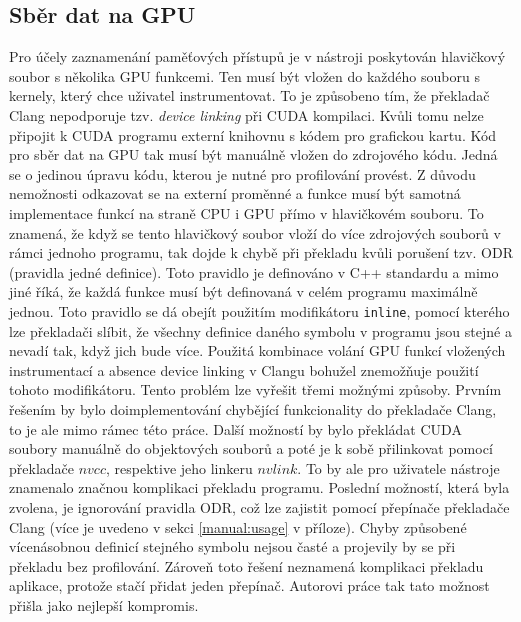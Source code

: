 \subsection{Sběr dat na GPU}
\label{sec:gpucollection}
Pro účely zaznamenání paměťových přístupů je v nástroji poskytován hlavičkový soubor s několika GPU funkcemi. Ten musí být vložen do každého souboru s kernely, který chce uživatel instrumentovat. To je způsobeno tím, že překladač Clang nepodporuje tzv. \emph{device linking} při CUDA kompilaci. Kvůli tomu nelze připojit k CUDA programu externí knihovnu s kódem pro grafickou kartu. Kód pro sběr dat na GPU tak musí být manuálně vložen do zdrojového kódu. Jedná se o jedinou úpravu kódu, kterou je nutné pro profilování provést.
Z důvodu nemožnosti odkazovat se na externí proměnné a funkce musí být samotná implementace funkcí na straně CPU i GPU přímo v hlavičkovém souboru. To znamená, že když se tento hlavičkový soubor vloží do více zdrojových souborů v rámci jednoho programu, tak dojde k chybě při překladu kvůli porušení tzv. ODR (pravidla jedné definice). Toto pravidlo je definováno v C++ standardu \cite{cppiso} a mimo jiné říká, že každá funkce musí být definovaná v celém programu maximálně jednou. Toto pravidlo se dá obejít použitím modifikátoru \texttt{inline}, pomocí kterého lze překladači slíbit, že všechny definice daného symbolu v programu jsou stejné a nevadí tak, když jich bude více. Použitá kombinace volání GPU funkcí vložených instrumentací a absence device linking v Clangu bohužel znemožňuje použití tohoto modifikátoru. 
Tento problém lze vyřešit třemi možnými způsoby. Prvním řešením by bylo doimplementování chybějící funkcionality do překladače Clang, to je ale mimo rámec této práce. Další možností by bylo překládat CUDA soubory manuálně do objektových souborů a poté je k sobě přilinkovat pomocí překladače $nvcc$, respektive jeho linkeru $nvlink$. To by ale pro uživatele nástroje znamenalo značnou komplikaci překladu programu. Poslední možností, která byla zvolena, je ignorování pravidla ODR, což lze zajistit pomocí přepínače překladače Clang (více je uvedeno v sekci \ref{manual:usage} v příloze). Chyby způsobené vícenásobnou definicí stejného symbolu nejsou časté a projevily by se při překladu bez profilování. Zároveň toto řešení neznamená komplikaci překladu aplikace, protože stačí přidat jeden přepínač. Autorovi práce tak tato možnost přišla jako nejlepší kompromis.

